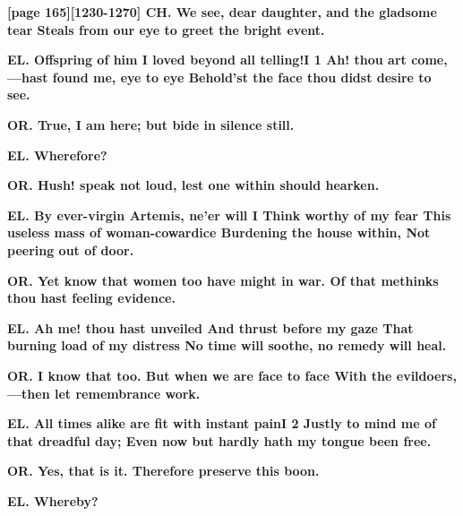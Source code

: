\documentclass[11pt,letter]{book}
\begin{document}
\par \textbf{[page 165][1230-1270] CH. We see, dear daughter, and the gladsome tear Steals from our eye to greet the bright event.}
\par 

\par \textbf{EL. Offspring of him I loved beyond all telling!I 1 Ah! thou art come,—hast found me, eye to eye Behold’st the face thou didst desire to see.}
\par 

\par \textbf{OR. True, I am here; but bide in silence still.}
\par 

\par \textbf{EL. Wherefore?}
\par 

\par \textbf{OR. Hush! speak not loud, lest one within should hearken.}
\par 

\par \textbf{EL. By ever-virgin Artemis, ne’er will I Think worthy of my fear This useless mass of woman-cowardice Burdening the house within, Not peering out of door.}
\par 

\par \textbf{OR. Yet know that women too have might in war. Of that methinks thou hast feeling evidence.}
\par 

\par \textbf{EL. Ah me! thou hast unveiled And thrust before my gaze That burning load of my distress No time will soothe, no remedy will heal.}
\par 

\par \textbf{OR. I know that too. But when we are face to face With the evildoers,—then let remembrance work.}
\par 

\par \textbf{EL. All times alike are fit with instant painI 2 Justly to mind me of that dreadful day; Even now but hardly hath my tongue been free.}
\par 

\par \textbf{OR. Yes, that is it. Therefore preserve this boon.}
\par 

\par \textbf{EL. Whereby?}
\par 
\end{document}

